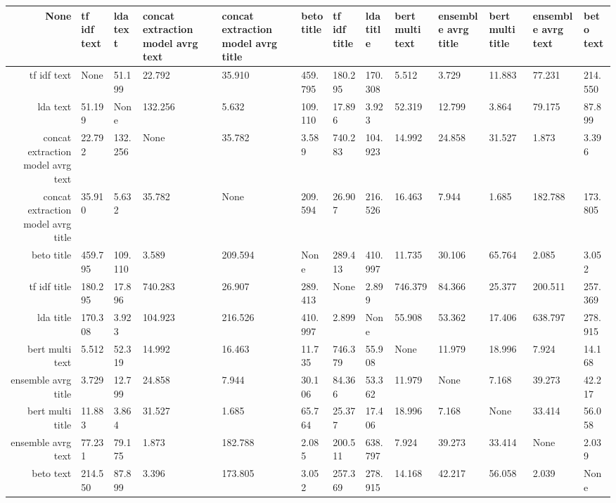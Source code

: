 \begin{tabular}{|r|l|l|l|l|l|l|l|l|l|l|l|l|}
  \hline
  None & tf idf text & lda text & concat extraction model avrg text & concat extraction model avrg title & beto title & tf idf title & lda title & bert multi text & ensemble avrg title & bert multi title & ensemble avrg text & beto text \\ 
  \hline
  tf idf text & None & 51.199 & 22.792 & 35.910 & 459.795 & 180.295 & 170.308 & 5.512 & 3.729 & 11.883 & 77.231 & 214.550 \\ 
  \hline
  lda text & 51.199 & None & 132.256 & 5.632 & 109.110 & 17.896 & 3.923 & 52.319 & 12.799 & 3.864 & 79.175 & 87.899 \\ 
  \hline
  concat extraction model avrg text & 22.792 & 132.256 & None & 35.782 & 3.589 & 740.283 & 104.923 & 14.992 & 24.858 & 31.527 & 1.873 & 3.396 \\ 
  \hline
  concat extraction model avrg title & 35.910 & 5.632 & 35.782 & None & 209.594 & 26.907 & 216.526 & 16.463 & 7.944 & 1.685 & 182.788 & 173.805 \\ 
  \hline
  beto title & 459.795 & 109.110 & 3.589 & 209.594 & None & 289.413 & 410.997 & 11.735 & 30.106 & 65.764 & 2.085 & 3.052 \\ 
  \hline
  tf idf title & 180.295 & 17.896 & 740.283 & 26.907 & 289.413 & None & 2.899 & 746.379 & 84.366 & 25.377 & 200.511 & 257.369 \\ 
  \hline
  lda title & 170.308 & 3.923 & 104.923 & 216.526 & 410.997 & 2.899 & None & 55.908 & 53.362 & 17.406 & 638.797 & 278.915 \\ 
  \hline
  bert multi text & 5.512 & 52.319 & 14.992 & 16.463 & 11.735 & 746.379 & 55.908 & None & 11.979 & 18.996 & 7.924 & 14.168 \\ 
  \hline
  ensemble avrg title & 3.729 & 12.799 & 24.858 & 7.944 & 30.106 & 84.366 & 53.362 & 11.979 & None & 7.168 & 39.273 & 42.217 \\ 
  \hline
  bert multi title & 11.883 & 3.864 & 31.527 & 1.685 & 65.764 & 25.377 & 17.406 & 18.996 & 7.168 & None & 33.414 & 56.058 \\ 
  \hline
  ensemble avrg text & 77.231 & 79.175 & 1.873 & 182.788 & 2.085 & 200.511 & 638.797 & 7.924 & 39.273 & 33.414 & None & 2.039 \\ 
  \hline
  beto text & 214.550 & 87.899 & 3.396 & 173.805 & 3.052 & 257.369 & 278.915 & 14.168 & 42.217 & 56.058 & 2.039 & None \\ 
  \hline
\end{tabular}
